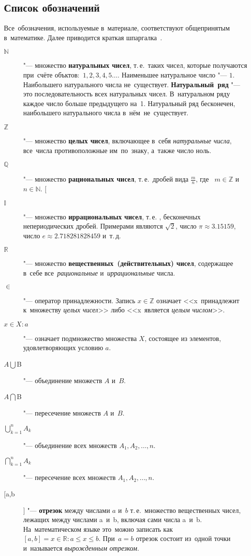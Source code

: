 \documentclass[]{scrartcl}
\begin{document}
\subsection{Список обозначений}
Все~обозначения, используемые в~материале, соответствуют общепринятым в~математике. Далее приводится краткая шпаргалка~\cite{CSC:intro-in-matan}.
\begin{description}
	\item[$\mathbb{N}$] "--- множество \textbf{натуральных чисел}, т.\,е.~таких чисел, которые получаются при~счёте объктов:~$1, 2, 3, 4, 5\ldots$. Наименьшее натуральное число "--- $1$. Наибольшего натурального числа не~существует. \textbf{Натуральный~ряд} "--- это последовательность всех натуральных чисел. В~натуральном ряду каждое число больше предыдущего на~1. Натуральный ряд бесконечен, наибольшего натурального числа в~нём~не~существует.
	\item[$\mathbb{Z}$] "--- множество \textbf{целых чисел}, включающее в~себя \emph{натуральные числа}, все~числа противоположные им~по~знаку, а~также число ноль.
	\item[$\mathbb{Q}$] "--- множество \textbf{рациональных чисел}, т.\,е.~дробей вида $\frac{m}{n}$, где~ $m \in \mathbb{Z}$ и~$n \in \mathbb{N}$.
	[\item[$\mathbb{I}$] "--- множество \textbf{иррациональных чисел}, т.\,е. , бесконечных непериодических дробей. Примерами являются $\sqrt{2}$, число $\pi \approx 3.15159$, число $e \approx 2.718281828459$ и~т.\,д.
	\item[$\mathbb{R}$] "--- множество \textbf{вещественных~(действительных) чисел}, содержащее в~себе все~\emph{рациональные} и~\emph{иррациональные} числа.
	\item[$\in$] "--- оператор принадлежности. Запись $x \in \mathbb{Z}$ означает <<x~принадлежит к~множеству \emph{целых чисел}>> либо <<x~является \emph{целым числом}>>.
	\item[$x\in X:a$] "--- означает подмножество множества $X$, состоящее из элементов, удовлетворяющих условию $a$.
	\item[$A\bigcup$B] "--- объединение множеств $A$ и~$B$.
	\item[$A\bigcap$B] "--- пересечение множеств $A$ и~$B$.
	\item[$\bigcup \limits_{k=1}^{n}A_k$] "--- объединение всех множеств $A_1, A_2,\ldots, n$.
	\item[$\bigcap \limits_{k=1}^{n}A_k$] "--- пересечение всех множеств $A_1, A_2,\ldots, n$.
	\item[[a,b]] "--- \textbf{отрезок} между числами $a$ и~$b$ т.\,е.~множество вещественных чисел, лежащих между числами a~и~b, включая сами числа a~и~b. На~математическом языке это~можно записать как~$[a, b] = {x \in \mathbb{R}: a \leq x \leq b }$. При~$a=b$ отрезок состоит из~одной точки и~называется \emph{вырожденным отрезком}.

\end{description}
\end{document}

